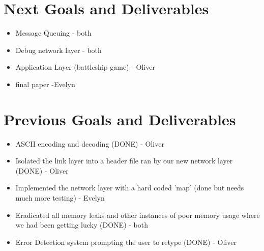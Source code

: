 \documentclass{article}
\begin{document}
\section*{Next Goals and Deliverables}
\begin{itemize}
\item Message Queuing - both
\item Debug network layer - both
\item Application Layer (battleship game) - Oliver
\item final paper -Evelyn
\end{itemize}
\section*{Previous Goals and Deliverables}
\begin{itemize}
\item ASCII encoding and decoding (DONE) - Oliver
\item Isolated the link layer into a header file ran by our new network layer (DONE) - Oliver 
\item Implemented the network layer with a hard coded 'map' (done but needs much more testing) - Evelyn
\item Eradicated all memory leaks and other instances of poor memory usage where we had been getting lucky (DONE) - both 
\item Error Detection system prompting the user to retype (DONE) - Oliver
\end{itemize}
\end{document}
